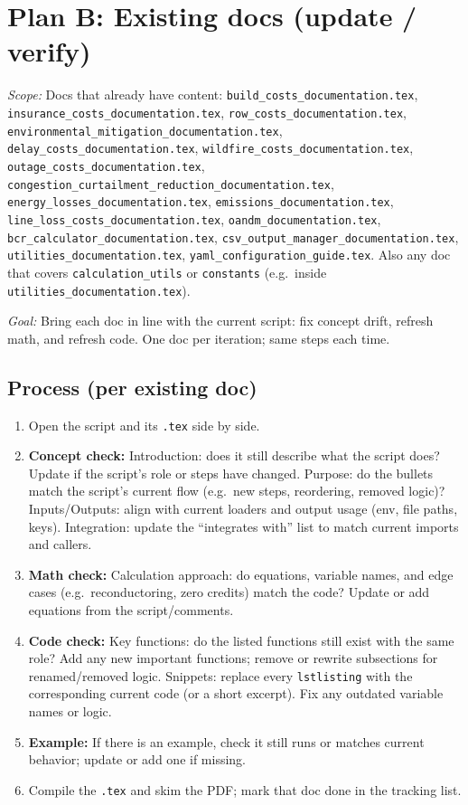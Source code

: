 \documentclass[12pt]{article}
\begin{document}
\section{Plan B: Existing docs (update / verify)}

\textit{Scope:} Docs that already have content: \texttt{build\_costs\_documentation.tex}, \texttt{insurance\_costs\_documentation.tex}, \texttt{row\_costs\_documentation.tex}, \texttt{environmental\_mitigation\_documentation.tex}, \texttt{delay\_costs\_documentation.tex}, \texttt{wildfire\_costs\_documentation.tex}, \texttt{outage\_costs\_documentation.tex}, \texttt{congestion\_curtailment\_reduction\_documentation.tex}, \texttt{energy\_losses\_documentation.tex}, \texttt{emissions\_documentation.tex}, \texttt{line\_loss\_costs\_documentation.tex}, \texttt{oandm\_documentation.tex}, \texttt{bcr\_calculator\_documentation.tex}, \texttt{csv\_output\_manager\_documentation.tex}, \texttt{utilities\_documentation.tex}, \texttt{yaml\_configuration\_guide.tex}. Also any doc that covers \texttt{calculation\_utils} or \texttt{constants} (e.g.\ inside \texttt{utilities\_documentation.tex}).

\textit{Goal:} Bring each doc in line with the current script: fix concept drift, refresh math, and refresh code. One doc per iteration; same steps each time.

\subsection{Process (per existing doc)}

\begin{enumerate}
  \item Open the script and its \texttt{.tex} side by side.
  \item \textbf{Concept check:} Introduction: does it still describe what the script does? Update if the script's role or steps have changed. Purpose: do the bullets match the script's current flow (e.g.\ new steps, reordering, removed logic)? Inputs/Outputs: align with current loaders and output usage (env, file paths, keys). Integration: update the ``integrates with'' list to match current imports and callers.
  \item \textbf{Math check:} Calculation approach: do equations, variable names, and edge cases (e.g.\ reconductoring, zero credits) match the code? Update or add equations from the script/comments.
  \item \textbf{Code check:} Key functions: do the listed functions still exist with the same role? Add any new important functions; remove or rewrite subsections for renamed/removed logic. Snippets: replace every \texttt{lstlisting} with the corresponding current code (or a short excerpt). Fix any outdated variable names or logic.
  \item \textbf{Example:} If there is an example, check it still runs or matches current behavior; update or add one if missing.
  \item Compile the \texttt{.tex} and skim the PDF; mark that doc done in the tracking list.
\end{enumerate}
\end{document}
